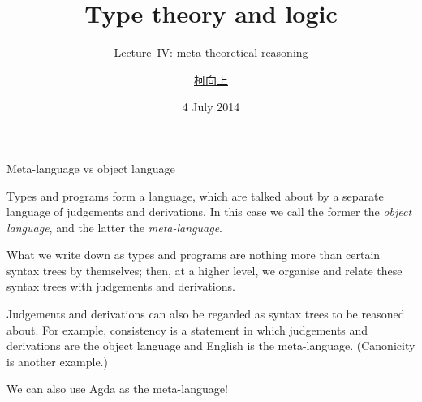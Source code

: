 \documentclass[t,compress,hyperref={hidelinks}]{beamer}
\newcommand{\lectureno}{IV}
\begin{document}

\title{Type theory and logic}
\subtitle{Lecture~\lectureno: meta-theoretical reasoning}
\date{4 July 2014}
\author{{\href{http://www.cs.ox.ac.uk/people/hsiang-shang.ko/}{柯向上}}}

{
\begin{frame}
\titlepage
\end{frame}}

\begin{frame}{Meta-language vs object language}

Types and programs form a language, which are talked about by a separate language of judgements and derivations.
In this case we call the former  the \emph{object language}, and the latter the \emph{meta-language}.

What we write down as types and programs are nothing more than certain syntax trees by themselves; then, at a higher level, we organise and relate these syntax trees with judgements and derivations.

Judgements and derivations can also be regarded as syntax trees to be reasoned about.
For example, consistency is a statement in which judgements and derivations are the object language and English is the meta-language.
(Canonicity is another example.)

We can also use Agda as the meta-language!

\end{frame}
\end{document}
